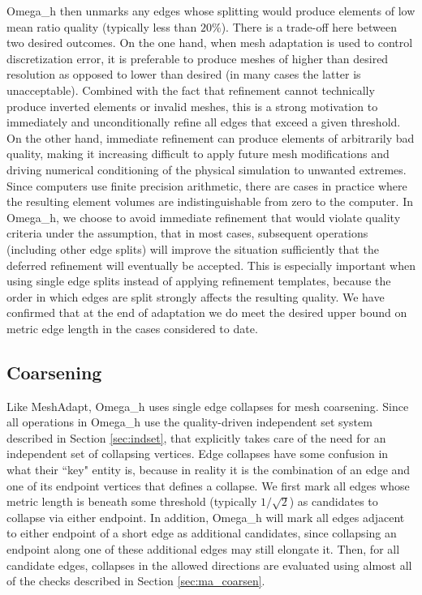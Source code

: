 Omega\_h then unmarks any edges whose splitting
would produce elements of low mean ratio quality (typically less than $20\%$).
There is a trade-off here between two desired outcomes.
On the one hand, when mesh adaptation is used to control discretization
error, it is preferable to produce meshes of higher than desired resolution
as opposed to lower than desired (in many cases the latter is unacceptable).
Combined with the fact that refinement cannot technically produce
inverted elements or invalid meshes, this is a strong motivation to immediately
and unconditionally refine all edges that exceed a given threshold.
On the other hand, immediate refinement can produce elements of arbitrarily
bad quality, making it increasing difficult to apply future mesh modifications
and driving numerical conditioning of the physical simulation to unwanted extremes.
Since computers use finite precision arithmetic, there are cases in practice
where the resulting element volumes are indistinguishable from zero to the computer.
In Omega\_h, we choose to avoid immediate refinement that would violate
quality criteria under the assumption, that in most cases, subsequent
operations (including other edge splits) will improve the situation
sufficiently that the deferred refinement will eventually be accepted.
This is especially important when using single edge splits instead of
applying refinement templates, because the order in which edges are split
strongly affects the resulting quality.
We have confirmed that at the end of adaptation we do meet the desired
upper bound on metric edge length in the cases considered to date.

\subsection{Coarsening}
\label{sec:osh_coarsen}

Like MeshAdapt, Omega\_h uses single edge collapses
for mesh coarsening.
Since all operations in Omega\_h use the quality-driven
independent set system described in Section \ref{sec:indset},
that explicitly takes care of the need for an independent
set of collapsing vertices.
Edge collapses have some confusion in what their ``key" entity is,
because in reality it is the combination of an edge and one
of its endpoint vertices that defines a collapse.
We first mark all edges whose metric length is beneath
some threshold (typically $1/\sqrt{2}$) as candidates to collapse
via either endpoint.
In addition, Omega\_h will mark all edges adjacent to either endpoint
of a short edge as additional candidates, since collapsing an endpoint
along one of these additional edges may still elongate it.
Then, for all candidate edges, collapses in the allowed directions are evaluated
using almost all of the checks described in Section \ref{sec:ma_coarsen}.

